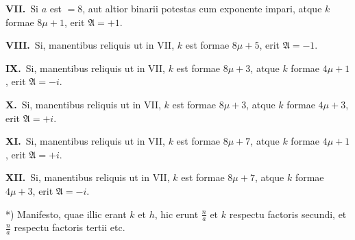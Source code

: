 \documentclass[12pt,a4paper]{article}
\theoremstyle{plain}
\begin{document}
\medskip
\noindent\textbf{VII.}\ Si $a$ est $= 8$, aut altior binarii potestas cum exponente impari, atque $k$ formae $8\mu+1$, erit $\mathfrak{A} = +1$.

\medskip
\noindent\textbf{VIII.}\ Si, manentibus reliquis ut in VII, $k$ est formae $8\mu+5$, erit $\mathfrak{A} = -1$.

\medskip
\noindent\textbf{IX.}\ Si, manentibus reliquis ut in VII, $k$ est formae $8\mu+3$, atque $k$ formae $4\mu+1$, erit $\mathfrak{A} = -i$.

\medskip
\noindent\textbf{X.}\ Si, manentibus reliquis ut in VII, $k$ est formae $8\mu+3$, atque $k$ formae $4\mu+3$, erit $\mathfrak{A} = +i$.

\medskip
\noindent\textbf{XI.}\ Si, manentibus reliquis ut in VII, $k$ est formae $8\mu+7$, atque $k$ formae $4\mu+1$, erit $\mathfrak{A} = +i$.

\medskip
\noindent\textbf{XII.}\ Si, manentibus reliquis ut in VII, $k$ est formae $8\mu+7$, atque $k$ formae $4\mu+3$, erit $\mathfrak{A} = -i$.

\medskip
\begin{flushright}
*) Manifesto, quae illic erant $k$ et $h$, hic erunt $\frac{n}{a}$ et $k$ respectu factoris secundi, et $\frac{n}{a}$ respectu factoris tertii etc.
\end{flushright}
\end{document}
